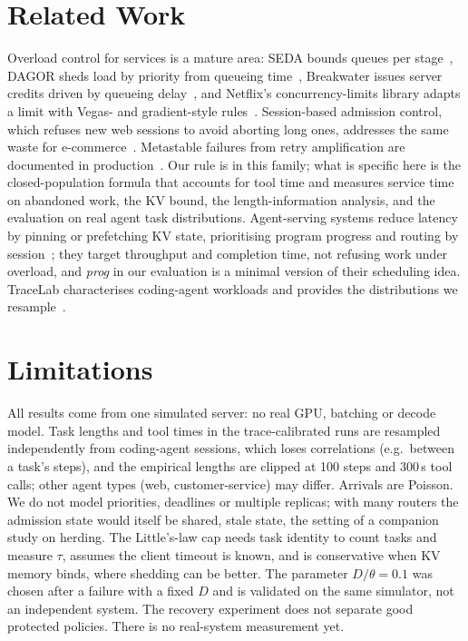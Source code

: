 \documentclass[10pt,twocolumn,letterpaper]{article}
\begin{document}
\section{Related Work}
Overload control for services is a mature area: SEDA bounds queues per stage~\citep{welsh2001seda}, DAGOR sheds load by priority from queueing time~\citep{zhou2018dagor}, Breakwater issues server credits driven by queueing delay~\citep{cho2020breakwater}, and Netflix's concurrency-limits library adapts a limit with Vegas- and gradient-style rules~\citep{netflixconcurrency}. Session-based admission control, which refuses new web sessions to avoid aborting long ones, addresses the same waste for e-commerce~\citep{cherkasova2002sbac}. Metastable failures from retry amplification are documented in production~\citep{bronson2021metastable,huang2022metastable}. Our rule is in this family; what is specific here is the closed-population formula that accounts for tool time and measures service time on abandoned work, the KV bound, the length-information analysis, and the evaluation on real agent task distributions. Agent-serving systems reduce latency by pinning or prefetching KV state, prioritising program progress and routing by session~\citep{continuum2025,tokencake2025,saga2026,cachewise2026,smetric2026,talaria2026}; they target throughput and completion time, not refusing work under overload, and \emph{prog} in our evaluation is a minimal version of their scheduling idea. TraceLab characterises coding-agent workloads and provides the distributions we resample~\citep{tracelab2026}.

\section{Limitations}\label{sec:limits}
All results come from one simulated server: no real GPU, batching or decode model. Task lengths and tool times in the trace-calibrated runs are resampled independently from coding-agent sessions, which loses correlations (e.g.\ between a task's steps), and the empirical lengths are clipped at 100 steps and 300\,s tool calls; other agent types (web, customer-service) may differ. Arrivals are Poisson. We do not model priorities, deadlines or multiple replicas; with many routers the admission state would itself be shared, stale state, the setting of a companion study on herding. The Little's-law cap needs task identity to count tasks and measure $\tau$, assumes the client timeout is known, and is conservative when KV memory binds, where shedding can be better. The parameter $D/\theta=0.1$ was chosen after a failure with a fixed $D$ and is validated on the same simulator, not an independent system. The recovery experiment does not separate good protected policies. There is no real-system measurement yet.
\end{document}
